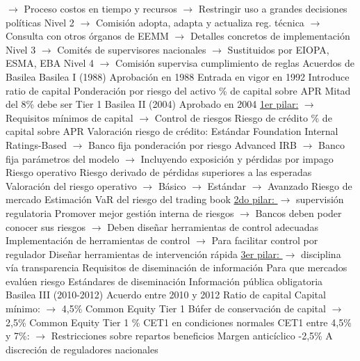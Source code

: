 \documentclass{nuevotema}
\begin{document}
\begin{esquemal}
				\4[] $\to$ Proceso costos en tiempo y recursos
				\4[] $\to$ Restringir uso a grandes decisiones políticas
				\4[] Nivel 2
				\4[] $\to$ Comisión adopta, adapta y actualiza reg. técnica
				\4[] $\to$ Consulta con otros órganos de EEMM
				\4[] $\to$ Detalles concretos de implementación
				\4[] Nivel 3
				\4[] $\to$ Comités de supervisores nacionales
				\4[] $\to$ Sustituidos por EIOPA, ESMA, EBA
				\4[] Nivel 4
				\4[] $\to$ Comisión supervisa cumplimiento de reglas
		\2 Acuerdos de Basilea
			\3 Basilea I (1988)
				\4 Aprobación en 1988
				\4 Entrada en vigor en 1992
				\4 Introduce ratio de capital
				\4 Ponderación por riesgo del activo
				\% de capital sobre APR
				\4 Mitad del 8\% debe ser Tier 1
			\3 Basilea II (2004)
				\4 Aprobado en 2004
				\4[I] \underline{1er pilar:}
				\4[] $\to$ Requisitos mínimos de capital
				\4[] $\to$ Control de riesgos
				\4 Riesgo de crédito
				\% de capital sobre APR
				\4[] Valoración riesgo de crédito:
				\4[] Estándar
				\4[] Foundation Internal Ratings-Based
				\4[] $\to$ Banco fija ponderación por riesgo
				\4[] Advanced IRB
				\4[] $\to$ Banco fija parámetros del modelo
				\4[] $\to$ Incluyendo exposición y pérdidas por impago
				\4 Riesgo operativo
				\4[] Riesgo derivado de pérdidas superiores a las esperadas
				\4[] Valoración del riesgo operativo
				\4[] $\to$ Básico
				\4[] $\to$ Estándar
				\4[] $\to$ Avanzado
				\4 Riesgo de mercado
				\4[] Estimación VaR del riesgo del trading book
				\4[II] \underline{2do pilar: }
				\4[] $\to$ supervisión regulatoria
				\4 Promover mejor gestión interna de riesgos
				\4[] $\to$ Bancos deben poder conocer sus riesgos
				\4[] $\to$ Deben diseñar herramientas de control adecuadas
				\4 Implementación de herramientas de control
				\4[] $\to$ Para facilitar control por regulador
				\4 Diseñar herramientas de intervención rápida
				\4[III] \underline{3er pilar: }
				\4[] $\to$ disciplina vía transparencia
				\4 Requisitos de diseminación de información
				\4[] Para que mercados evalúen riesgo
				\4 Estándares de diseminación
				\4 Información pública obligatoria
			\3 Basilea III (2010-2012)
				\4 Acuerdo entre 2010 y 2012
				\4 Ratio de capital
				\4[] Capital mínimo:
				\4[] $\to$ 4,5\% Common Equity Tier 1
				\4[] Búfer de conservación de capital
				\4[] $\to$ 2,5\% Common Equity Tier 1
				\% CET1 en condiciones normales
				\4[$\then$] CET1 entre 4,5\% y 7\%:
				\4[] $\to$ Restricciones sobre repartos beneficios
				\4 Margen anticíclico
				-2,5\%
				\4[] A discreción de reguladores nacionales

\end{esquemal}
\end{document}
